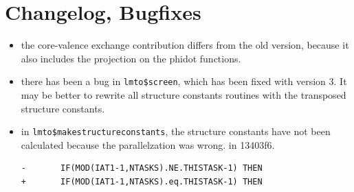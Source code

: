 \documentclass[11pt,a4paper]{report}
\begin{document}
\chapter{Changelog, Bugfixes}
\begin{itemize}
\item the core-valence exchange contribution differs from the old
  version, because it also includes the projection on the phidot
  functions.
%
\item there has been a bug in \verb|lmto$screen|, which has been fixed
  with version 3. It may be better to rewrite all structure constants
  routines with the transposed structure constants.
%
\item in \verb|lmto$makestructureconstants|, the structure constants
  have not been calculated because the parallelzation was wrong.  in
  13403f6.
\begin{verbatim}
-       IF(MOD(IAT1-1,NTASKS).NE.THISTASK-1) THEN
+       IF(MOD(IAT1-1,NTASKS).eq.THISTASK-1) THEN
\end{verbatim}
%
\end{itemize}


\clearpage
 
\end{document}
